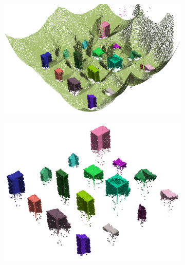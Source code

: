 \begin{figure}
\begin{subfigure}[t]{0.45\linewidth}
		\label{fig:smat_r3d_sheets_all}
	\end{subfigure}
	\quad
	\begin{subfigure}[t]{0.45\linewidth}
		\includegraphics[width=\linewidth]{figs/smat/smat_r3d_ballo_all.png}
		\label{fig:smat_r3d_ballo_all}
	\end{subfigure}
	\quad
	\begin{subfigure}[t]{0.45\linewidth}
		\includegraphics[width=\linewidth]{figs/smat/smat_r3d_mat_int.png}
		\label{fig:smat_r3d_ballo_int}
	\end{subfigure}
	\quad
	\begin{subfigure}[t]{0.45\linewidth}

\end{subfigure}
\end{figure}
